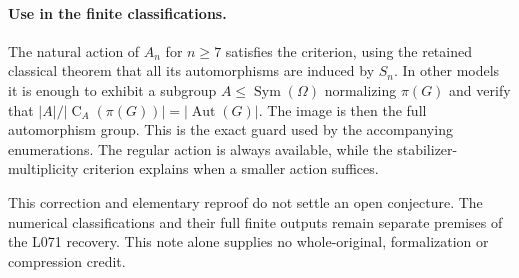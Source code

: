 \documentclass[11pt,a4paper]{article}
\newcommand{\Aut}{\operatorname{Aut}}
\newcommand{\Sym}{\operatorname{Sym}}
\newcommand{\C}{\operatorname{C}}
\begin{document}
\paragraph{Use in the finite classifications.}
The natural action of $A_n$ for $n\ge7$ satisfies the criterion,
using the retained classical theorem that all its automorphisms are
induced by $S_n$. In other models it is enough to exhibit a subgroup
$A\le\Sym(\Omega)$ normalizing $\pi(G)$ and verify that
$|A|/|\C_A(\pi(G))|=|\Aut(G)|$. The image is then the full
automorphism group. This is the exact guard used by the accompanying
enumerations. The regular action is always available, while the
stabilizer-multiplicity criterion explains when a smaller action
suffices.

This correction and elementary reproof do not settle an open
conjecture. The numerical classifications and their full finite
outputs remain separate premises of the L071 recovery. This note
alone supplies no whole-original, formalization or compression credit.
\end{document}
